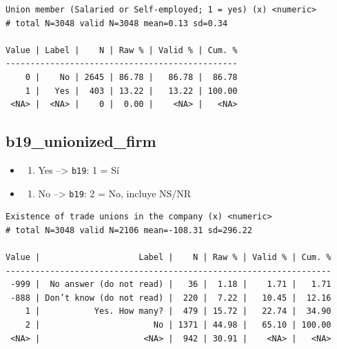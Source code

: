 \documentclass[
  letterpaper,
  DIV=11,
  numbers=noendperiod]{scrreprt}
\newenvironment{Shaded}{\begin{snugshade}}{\end{snugshade}}
\newcommand{\FunctionTok}[1]{\textcolor[rgb]{0.28,0.35,0.67}{#1}}
\newcommand{\NormalTok}[1]{\textcolor[rgb]{0.00,0.23,0.31}{#1}}
\newcommand{\SpecialCharTok}[1]{\textcolor[rgb]{0.37,0.37,0.37}{#1}}
\providecommand{\tightlist}{%
  \setlength{\itemsep}{0pt}\setlength{\parskip}{0pt}}
\begin{document}
\begin{verbatim}
Union member (Salaried or Self-employed; 1 = yes) (x) <numeric> 
# total N=3048 valid N=3048 mean=0.13 sd=0.34

Value | Label |    N | Raw % | Valid % | Cum. %
-----------------------------------------------
    0 |    No | 2645 | 86.78 |   86.78 |  86.78
    1 |   Yes |  403 | 13.22 |   13.22 | 100.00
 <NA> |  <NA> |    0 |  0.00 |    <NA> |   <NA>
\end{verbatim}

\subsection{b19\_unionized\_firm}\label{b19_unionized_firm}

\begin{itemize}
\tightlist
\item
  \begin{enumerate}
  \def\labelenumi{\arabic{enumi}.}
  \tightlist
  \item
    Yes --\textgreater{} \texttt{b19}: 1 = Sí
  \end{enumerate}
\item
  \begin{enumerate}
  \def\labelenumi{\arabic{enumi}.}
  \setcounter{enumi}{-1}
  \tightlist
  \item
    No --\textgreater{} \texttt{b19}: 2 = No, incluye NS/NR
  \end{enumerate}
\end{itemize}

\begin{Shaded}
\end{Shaded}

\begin{verbatim}
Existence of trade unions in the company (x) <numeric> 
# total N=3048 valid N=2106 mean=-108.31 sd=296.22

Value |                    Label |    N | Raw % | Valid % | Cum. %
------------------------------------------------------------------
 -999 |  No answer (do not read) |   36 |  1.18 |    1.71 |   1.71
 -888 | Don’t know (do not read) |  220 |  7.22 |   10.45 |  12.16
    1 |           Yes. How many? |  479 | 15.72 |   22.74 |  34.90
    2 |                       No | 1371 | 44.98 |   65.10 | 100.00
 <NA> |                     <NA> |  942 | 30.91 |    <NA> |   <NA>
\end{verbatim}
\end{document}
